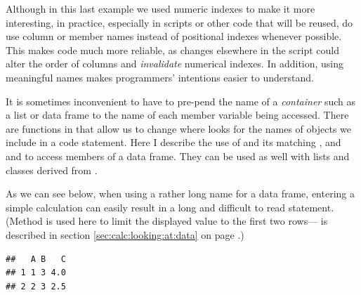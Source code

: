 \documentclass[krantz2]{krantz}\usepackage{knitr}%
\begin{document}
\begin{warningbox}
Although in this last example we used numeric indexes to make it more interesting, in practice, especially in scripts or other code that will be reused, do use column or member names instead of positional indexes whenever possible. This makes code much more reliable, as changes elsewhere in the script could alter the order of columns and \emph{invalidate} numerical indexes. In addition, using meaningful names makes programmers' intentions easier to understand.
\end{warningbox}

\begin{explainbox}
It is sometimes inconvenient to have to pre-pend the name of a \emph{container} such as a list or data frame to the name of each member variable being accessed. There are functions in \Rlang that allow us to change where \Rlang looks for the names of objects we include in a code statement. Here I describe the use of  and its matching , and  and  to access members of a data frame. They can be used as well with lists and classes derived from .

As we can see below, when using a rather long name for a data frame, entering a simple calculation can easily result in a long and difficult to read statement. (Method  is used here to limit the displayed value to the first two rows--- is described in section \ref{sec:calc:looking:at:data} on page \pageref{sec:calc:looking:at:data}.)

\begin{knitrout}\footnotesize
{}\color{fgcolor}\begin{kframe}
\begin{alltt}
 \hlkwb{<-} \hlstd{(} \hlstd{=} \hlopt{:}\hlstd{,}  \hlstd{=} \hlstd{)}
\hlopt{$} \hlkwb{<-}
  \hlopt{$} \hlopt{+} \hlopt{$} \hlopt{/} \hlopt{$}
 \hlstd{)}
\end{alltt}
\begin{verbatim}
##   A B   C
## 1 1 3 4.0
## 2 2 3 2.5
\end{verbatim}
\end{kframe}
\end{knitrout}


\end{explainbox}
\end{document}
